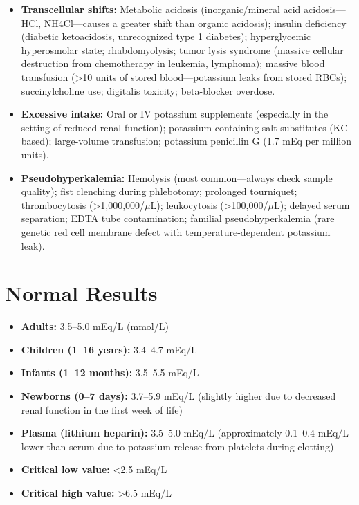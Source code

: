 \begin{itemize}
  \item \textbf{Transcellular shifts:} Metabolic acidosis (inorganic/mineral acid acidosis---HCl, NH4Cl---causes a greater shift than organic acidosis); insulin deficiency (diabetic ketoacidosis, unrecognized type 1 diabetes); hyperglycemic hyperosmolar state; rhabdomyolysis; tumor lysis syndrome (massive cellular destruction from chemotherapy in leukemia, lymphoma); massive blood transfusion (>10 units of stored blood---potassium leaks from stored RBCs); succinylcholine use; digitalis toxicity; beta-blocker overdose.
  \item \textbf{Excessive intake:} Oral or IV potassium supplements (especially in the setting of reduced renal function); potassium-containing salt substitutes (KCl-based); large-volume transfusion; potassium penicillin G (1.7 mEq per million units).
  \item \textbf{Pseudohyperkalemia:} Hemolysis (most common---always check sample quality); fist clenching during phlebotomy; prolonged tourniquet; thrombocytosis (>1,000,000/$\mu$L); leukocytosis (>100,000/$\mu$L); delayed serum separation; EDTA tube contamination; familial pseudohyperkalemia (rare genetic red cell membrane defect with temperature-dependent potassium leak).
\end{itemize}

\section*{Normal Results}
\begin{itemize}
  \item \textbf{Adults:} 3.5--5.0 mEq/L (mmol/L)
  \item \textbf{Children (1--16 years):} 3.4--4.7 mEq/L
  \item \textbf{Infants (1--12 months):} 3.5--5.5 mEq/L
  \item \textbf{Newborns (0--7 days):} 3.7--5.9 mEq/L (slightly higher due to decreased renal function in the first week of life)
  \item \textbf{Plasma (lithium heparin):} 3.5--5.0 mEq/L (approximately 0.1--0.4 mEq/L lower than serum due to potassium release from platelets during clotting)
  \item \textbf{Critical low value:} <2.5 mEq/L
  \item \textbf{Critical high value:} >6.5 mEq/L
\end{itemize}

